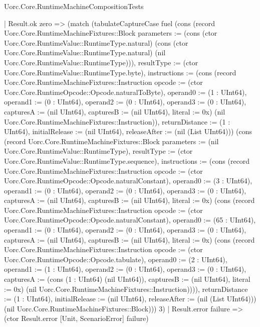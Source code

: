 \begin{lexlean}{Uorc.Core.RuntimeMachineCompositionTests}
\begin{semanticmodule}
{    | Result.ok zero => (match (tabulateCaptureCase fuel (cons (record Uorc.Core.RuntimeMachineFixtures::Block {parameters := (cons (ctor Uorc.Core.RuntimeValue::RuntimeType.natural) (cons (ctor Uorc.Core.RuntimeValue::RuntimeType.natural) (nil Uorc.Core.RuntimeValue::RuntimeType))), resultType := (ctor Uorc.Core.RuntimeValue::RuntimeType.byte), instructions := (cons (record Uorc.Core.RuntimeMachineFixtures::Instruction {opcode := (ctor Uorc.Core.RuntimeOpcode::Opcode.naturalToByte), operand0 := (1 : UInt64), operand1 := (0 : UInt64), operand2 := (0 : UInt64), operand3 := (0 : UInt64), capturesA := (nil UInt64), capturesB := (nil UInt64), literal := 0x}) (nil Uorc.Core.RuntimeMachineFixtures::Instruction)), returnDistance := (1 : UInt64), initialRelease := (nil UInt64), releaseAfter := (nil (List UInt64))}) (cons (record Uorc.Core.RuntimeMachineFixtures::Block {parameters := (nil Uorc.Core.RuntimeValue::RuntimeType), resultType := (ctor Uorc.Core.RuntimeValue::RuntimeType.sequence), instructions := (cons (record Uorc.Core.RuntimeMachineFixtures::Instruction {opcode := (ctor Uorc.Core.RuntimeOpcode::Opcode.naturalConstant), operand0 := (3 : UInt64), operand1 := (0 : UInt64), operand2 := (0 : UInt64), operand3 := (0 : UInt64), capturesA := (nil UInt64), capturesB := (nil UInt64), literal := 0x}) (cons (record Uorc.Core.RuntimeMachineFixtures::Instruction {opcode := (ctor Uorc.Core.RuntimeOpcode::Opcode.naturalConstant), operand0 := (65 : UInt64), operand1 := (0 : UInt64), operand2 := (0 : UInt64), operand3 := (0 : UInt64), capturesA := (nil UInt64), capturesB := (nil UInt64), literal := 0x}) (cons (record Uorc.Core.RuntimeMachineFixtures::Instruction {opcode := (ctor Uorc.Core.RuntimeOpcode::Opcode.tabulate), operand0 := (2 : UInt64), operand1 := (1 : UInt64), operand2 := (0 : UInt64), operand3 := (0 : UInt64), capturesA := (cons (1 : UInt64) (nil UInt64)), capturesB := (nil UInt64), literal := 0x}) (nil Uorc.Core.RuntimeMachineFixtures::Instruction)))), returnDistance := (1 : UInt64), initialRelease := (nil UInt64), releaseAfter := (nil (List UInt64))}) (nil Uorc.Core.RuntimeMachineFixtures::Block))) 3)
      | Result.error failure => (ctor Result.error [Unit, ScenarioError] failure)
}
\end{semanticmodule}
\end{lexlean}
